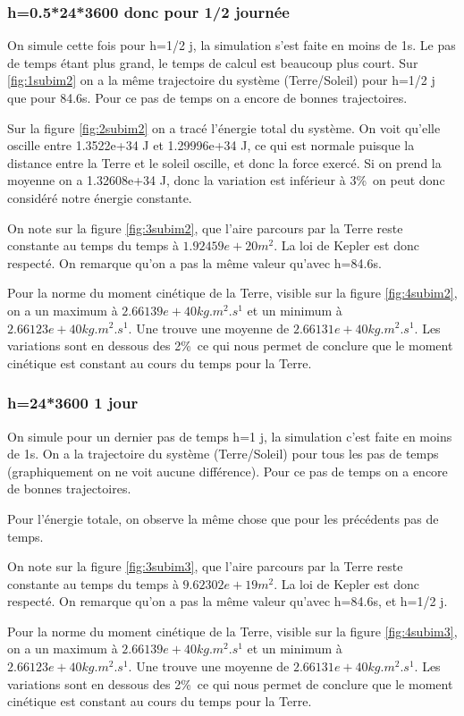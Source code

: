 \documentclass[11pt]{article}
\begin{document}
\subsubsection{h=0.5*24*3600 donc pour 1/2 journée}
On  simule cette fois pour h=1/2 j, la simulation s'est faite en moins de 1s. Le pas de temps étant plus grand, le temps de calcul est beaucoup plus court. Sur \ref{fig:1subim2} on a la même trajectoire du système (Terre/Soleil) pour h=1/2 j que pour 84.6s. Pour ce pas de temps on a encore de bonnes trajectoires.

Sur la figure \ref{fig:2subim2} on a tracé l'énergie total du système. On voit qu'elle oscille entre 1.3522e+34 J et 1.29996e+34 J, ce qui est normale puisque la distance entre la Terre et le soleil oscille, et donc la force exercé. Si on prend la moyenne on a 1.32608e+34 J, donc la variation est inférieur à 3\%\ on peut donc considéré notre énergie constante. 


On note sur la figure \ref{fig:3subim2}, que l'aire parcours par la Terre reste constante au temps du temps à \(1.92459e+20 m^2\). La loi de Kepler est donc respecté. On remarque qu'on a pas la même valeur qu'avec h=84.6s.

Pour la norme du moment cinétique de la Terre, visible sur la figure \ref{fig:4subim2}, on a un maximum à \(2.66139e+40 kg.m^2.s^1\) et un minimum à \(2.66123e+40 kg.m^2.s^1\). Une trouve une moyenne de \(2.66131 e+40 kg.m^2.s^1\). Les variations sont en dessous des 2\%\ ce qui nous permet de conclure que le moment cinétique est constant au cours du temps pour la Terre.


\subsubsection{h=24*3600 1 jour}
On  simule pour un dernier pas de temps h=1 j, la simulation c'est faite en moins de 1s. On a la trajectoire du système (Terre/Soleil) pour tous les pas de temps (graphiquement on ne voit aucune différence). Pour ce pas de temps on a encore de bonnes trajectoires. 

Pour l'énergie totale, on observe la même chose que pour les précédents pas de temps.

On note sur la figure \ref{fig:3subim3}, que l'aire parcours par la Terre reste constante au temps du temps à \(9.62302e+19 m^2\). La loi de Kepler est donc respecté. On remarque qu'on a pas la même valeur qu'avec h=84.6s, et h=1/2 j.

Pour la norme du moment cinétique de la Terre, visible sur la figure \ref{fig:4subim3}, on a un maximum à \(2.66139e+40 kg.m^2.s^1\) et un minimum à \(2.66123e+40 kg.m^2.s^1\). Une trouve une moyenne de \(2.66131 e+40 kg.m^2.s^1\). Les variations sont en dessous des 2\%\ ce qui nous permet de conclure que le moment cinétique est constant au cours du temps pour la Terre.
\end{document}
